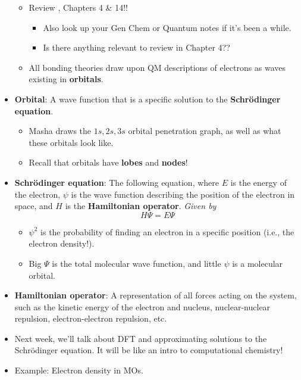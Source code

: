 \documentclass[../notes.tex]{subfiles}
\begin{document}
\begin{itemize}
    \begin{itemize}
        \item Review \textcite{bib:Anslyn}, Chapters 4 \& 14!!
        \begin{itemize}
            \item Also look up your Gen Chem or Quantum notes if it's been a while.
            \item Is there anything relevant to review in Chapter 4??
        \end{itemize}
        \item All bonding theories draw upon QM descriptions of electrons as waves existing in \textbf{orbitals}.
    \end{itemize}
    \item \textbf{Orbital}: A wave function that is a specific solution to the \textbf{Schr\"{o}dinger equation}.
    \begin{itemize}
        \item Masha draws the $1s,2s,3s$ orbital penetration graph, as well as what these orbitals look like.
        \item Recall that orbitals have \textbf{lobes} and \textbf{nodes}!
    \end{itemize}
    \item \textbf{Schr\"{o}dinger equation}: The following equation, where $E$ is the energy of the electron, $\psi$ is the wave function describing the position of the electron in space, and $H$ is the \textbf{Hamiltonian operator}. \emph{Given by}
    \begin{equation*}
        H\Psi = E\Psi
    \end{equation*}
    \begin{itemize}
        \item $\psi^2$ is the probability of finding an electron in a specific position (i.e., the electron density!).
        \item Big $\Psi$ is the total molecular wave function, and little $\psi$ is a molecular orbital.
    \end{itemize}
    \item \textbf{Hamiltonian operator}: A representation of all forces acting on the system, such as the kinetic energy of the electron and nucleus, nuclear-nuclear repulsion, electron-electron repulsion, etc.
    \item Next week, we'll talk about DFT and approximating solutions to the Schr\"{o}dinger equation. It will be like an intro to computational chemistry!
    \item Example: Electron density in  MOs.

\end{itemize}
\end{document}
